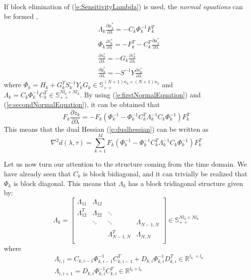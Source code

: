 If block elimination of (\ref{e:SensitivityLambda}) is used, the \emph{normal equations} can be formed \cite{Wright1997},
\begin{subequations}
\begin{align}
& \Lambda_k \frac{\partial \mu_k^*}{\partial \lambda} = -C_k \Phi_k^{-1} F_k^T \label{e:firstNormalEquation} \\
& \Phi_k \frac{\partial z_k^*}{\partial \lambda} = -F_k^T - C_k^T \frac{\partial \mu_k^*}{\partial \lambda} \label{e:secondNormalEquation} \\
& \frac{\partial s_k^*}{\partial \lambda} = -G_k \frac{\partial z_k^*}{\partial \lambda} \\
& \frac{\partial y_k^*}{\partial \lambda} = -S^{-1} Y \frac{\partial s_k^*}{\partial \lambda}
\end{align}
\end{subequations}
where $\Phi_k = H_k + G_k^T S_k^{-1} Y_k G_k \in \mathbb{S}_{++}^{(N+1)n_k \times (N+1)n_k}$ and $\Lambda_k = C_k \Phi_k^{-1} C_k^{T} \in \mathbb{S}_{++}^{N l_k \times N l_k}$. By using (\ref{e:firstNormalEquation}) and (\ref{e:secondNormalEquation}), it can be obtained that
\begin{equation}
\label{e:localcontributions}
F_k \frac{\partial z_k}{\partial \lambda} = -F_k (\Phi_k^{-1} - \Phi_k^{-1} C_k^T \Lambda_k^{-1} C_k \Phi_k^{-1}) F_k^T
\end{equation}
This means that the dual Hessian (\ref{e:dualhessian}) can be written as
\begin{equation}
\label{e:dualhessian2}
\nabla^2 d(\lambda, \tau) = \sum_{k=1}^M F_k (\Phi_k^{-1} - \Phi_k^{-1} C_k^T \Lambda_k^{-1} C_k \Phi_k^{-1}) F_k^T
\end{equation}

Let us now turn our attention to the structure coming from the time domain. We have already seen that $C_k$ is block bidiagonal, and it can trivially be realized that $\Phi_k$ is block diagonal. This means that $\Lambda_k$ has a block tridiagonal structure given by:
\begin{equation}
\Lambda_k = \left[ \begin{array}{cccc} 
\Lambda_{11} &  \Lambda_{12} &   &  \\
\Lambda_{12}^T &  \Lambda_{22} & \ddots  &  \\
  &  \ddots & \ddots  & \Lambda_{N-1,N} \\
    &   & \Lambda_{N-1,N}^T  & \Lambda_{N,N} \\
\end{array} \right] \in \mathbb{S}_{++}^{N l_{k} \times N l_{k}}
\end{equation}
where
\begin{subequations}
\label{e:LambdaComponents}
\begin{align}
& \Lambda_{i,i} = C_{k,i-1}\Phi_{k,i-1}^{-1}C_{k,i-1}^T + D_{k,i}\Phi_{k,i}^{-1}D_{k,i}^T \in \mathbb{R}^{l_{k,} \times l_{k}} \\
& \Lambda_{i,i+1} = D_{k,i} \Phi_{k,i}^{-1}C_{k,i}^T \in \mathbb{R}^{l_{k} \times l_{k}}
\end{align}
\end{subequations}

